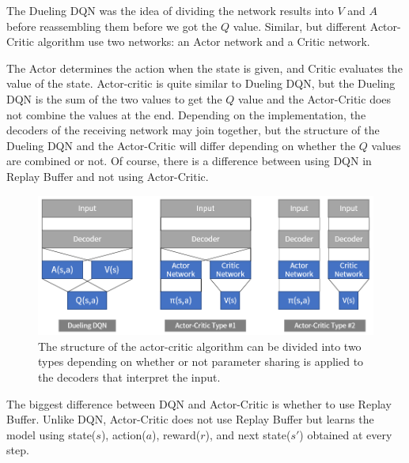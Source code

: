 The Dueling DQN was the idea of ​​dividing the network results into $V$ and 
$A$ before reassembling them before we got the $Q$ value. Similar, but 
different Actor-Critic algorithm use two networks: an Actor network and 
a Critic network.

The Actor determines the action when the state is given, and Critic 
evaluates the value of the state. Actor-critic is quite similar to 
Dueling DQN, but the Dueling DQN is the sum of the two values to get the 
$Q$ value and the Actor-Critic does not combine the values at the end. 
Depending on the implementation, the decoders of the receiving network 
may join together, but the structure of the Dueling DQN and the 
Actor-Critic will differ depending on whether the $Q$ values are combined 
or not. Of course, there is a difference between using DQN in Replay 
Buffer and not using Actor-Critic.

\begin{figure}[h]
\centering
\includegraphics[scale=0.618]{pix/sac/rl4_0.png}
\caption{The structure of the actor-critic algorithm can be divided into 
two types depending on whether or not parameter sharing is applied to 
the decoders that interpret the input.}
\label{fig:two_types_actor_critic}
\end{figure}

The biggest difference between DQN and Actor-Critic is whether to use 
Replay Buffer. Unlike DQN, Actor-Critic does not use Replay Buffer but 
learns the model using state($s$), action($a$), reward($r$), and next 
state($s'$) obtained at every step.

